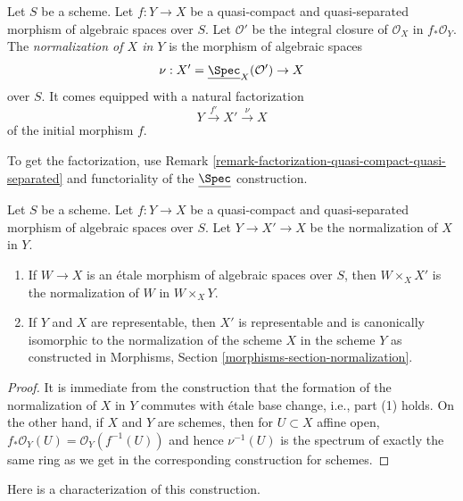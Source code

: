 \begin{definition}
\label{definition-normalization-X-in-Y}
Let $S$ be a scheme. Let $f : Y \to X$ be a quasi-compact and quasi-separated
morphism of algebraic spaces over $S$. Let $\mathcal{O}'$ be the integral
closure of $\mathcal{O}_X$ in $f_*\mathcal{O}_Y$. The {\it normalization of
$X$ in $Y$} is the morphism of algebraic spaces
$$
\nu : X' = \underline{\Spec}_X(\mathcal{O}') \to X
$$
over $S$. It comes equipped with a natural factorization
$$
Y \xrightarrow{f'} X' \xrightarrow{\nu} X
$$
of the initial morphism $f$.
\end{definition}

\noindent
To get the factorization, use Remark
\ref{remark-factorization-quasi-compact-quasi-separated}
and functoriality of the $\underline{\Spec}$ construction.

\begin{lemma}
\label{lemma-properties-normalization}
Let $S$ be a scheme. Let $f : Y \to X$ be a quasi-compact and quasi-separated
morphism of algebraic spaces over $S$. Let $Y \to X' \to X$ be the
normalization of $X$ in $Y$.
\begin{enumerate}
\item If $W \to X$ is an \'etale morphism of algebraic spaces over $S$,
then $W \times_X X'$ is the normalization of $W$ in $W \times_X Y$.
\item If $Y$ and $X$ are representable, then $X'$ is representable
and is canonically isomorphic to the normalization of the scheme $X$
in the scheme $Y$ as constructed in
Morphisms, Section \ref{morphisms-section-normalization}.
\end{enumerate}
\end{lemma}

\begin{proof}
It is immediate from the construction that the formation
of the normalization of $X$ in $Y$ commutes with \'etale
base change, i.e., part (1) holds. On the other hand, if
$X$ and $Y$ are schemes, then for $U \subset X$ affine open,
$f_*\mathcal{O}_Y(U) = \mathcal{O}_Y(f^{-1}(U))$ and hence
$\nu^{-1}(U)$ is the spectrum of exactly the same ring as
we get in the corresponding construction for schemes.
\end{proof}

\noindent
Here is a characterization of this construction.


